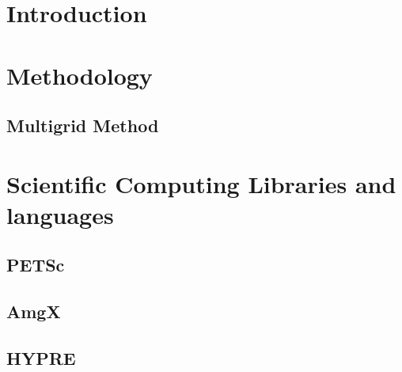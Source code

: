 \chapter{Introduction}


\chapter{Methodology}

\section{Multigrid Method}


\chapter{Scientific Computing Libraries and languages}
\section{PETSc}

\section{AmgX}

\section{HYPRE}


